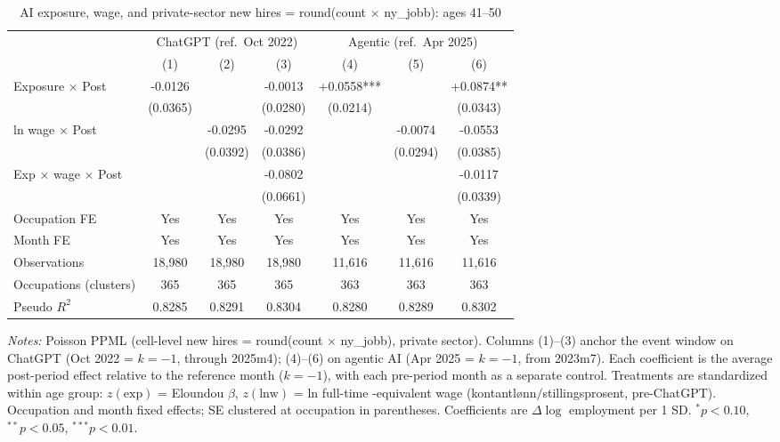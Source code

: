 \begin{table}[htbp]\centering
\caption{AI exposure, wage, and private-sector new hires = round(count $\times$ ny\_jobb): ages 41–50}
\label{tab:ca_did_age3}
\small
\begin{tabular}{lcccccc}
\toprule
 & \multicolumn{3}{c}{ChatGPT (ref.\ Oct 2022)} & \multicolumn{3}{c}{Agentic (ref.\ Apr 2025)} \\
\cmidrule(lr){2-4} \cmidrule(lr){5-7}
 & (1) & (2) & (3) & (4) & (5) & (6) \\
\midrule
Exposure $\times$ Post & -0.0126 &  & -0.0013 & +0.0558*** &  & +0.0874** \\
 & (0.0365) &  & (0.0280) & (0.0214) &  & (0.0343) \\
ln wage $\times$ Post &  & -0.0295 & -0.0292 &  & -0.0074 & -0.0553 \\
 &  & (0.0392) & (0.0386) &  & (0.0294) & (0.0385) \\
Exp $\times$ wage $\times$ Post &  &  & -0.0802 &  &  & -0.0117 \\
 &  &  & (0.0661) &  &  & (0.0339) \\
\midrule
Occupation FE & Yes & Yes & Yes & Yes & Yes & Yes \\
Month FE & Yes & Yes & Yes & Yes & Yes & Yes \\
Observations & 18,980 & 18,980 & 18,980 & 11,616 & 11,616 & 11,616 \\
Occupations (clusters) & 365 & 365 & 365 & 363 & 363 & 363 \\
Pseudo $R^2$ & 0.8285 & 0.8291 & 0.8304 & 0.8280 & 0.8289 & 0.8302 \\
\bottomrule
\end{tabular}
\begin{minipage}{\linewidth}\vspace{2pt}\footnotesize
\emph{Notes:} Poisson PPML (cell-level new hires = round(count $\times$ ny\_jobb), private sector). Columns (1)--(3) anchor the event window on ChatGPT (Oct 2022 = $k{=}{-}1$, through 2025m4); (4)--(6) on agentic AI (Apr 2025 = $k{=}{-}1$, from 2023m7). Each coefficient is the average post-period effect relative to the reference month ($k{=}{-}1$), with each pre-period month as a separate control. Treatments are standardized within age group: $z(\text{exp})$ = Eloundou $\beta$, $z(\text{lnw})$ = ln full-time -equivalent wage (kontantl\o nn$/$stillingsprosent, pre-ChatGPT). Occupation and month fixed effects; SE clustered at occupation in parentheses. Coefficients are $\Delta\log$ employment per 1 SD. $^{*}p<0.10$, $^{**}p<0.05$, $^{***}p<0.01$.
\end{minipage}
\end{table}